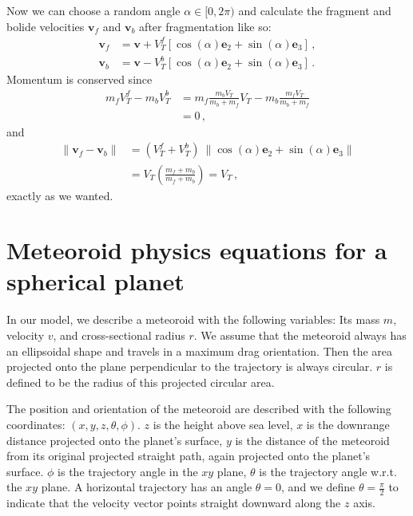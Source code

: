 Now we can choose a random angle $\alpha \in [0, 2\pi)$ and calculate the fragment and bolide velocities $\pmb{v}_f$ and $\pmb{v}_b$ after fragmentation like so:
\begin{align}
    \pmb{v}_f &= \pmb{v} + V_T^f[\cos(\alpha)\pmb{e}_2 + \sin(\alpha)\pmb{e}_3]\,,\\
    \pmb{v}_b &= \pmb{v} - V_T^b[\cos(\alpha)\pmb{e}_2 + \sin(\alpha)\pmb{e}_3]\,.
\end{align}
Momentum is conserved since
\begin{align*}
    m_f V_T^f - m_b V_T^b &= m_f\frac{m_b V_T}{m_b + m_f}V_T - m_b\frac{m_f V_T}{m_b + m_f} \\
    &= 0\,,
\end{align*}
and 
\begin{align*}
    \|\pmb{v}_f - \pmb{v}_b\| &= (V_T^f + V_T^b)\ \|\cos(\alpha)\pmb{e}_2 + \sin(\alpha)\pmb{e}_3\| \\
    &= V_T \left(\frac{m_f + m_b}{m_f + m_b}\right) = V_T\,,
\end{align*}
exactly as we wanted.

\section{Meteoroid physics equations for a spherical planet}
\label{sec:meteoroid_eq_deriv}
In our model, we describe a meteoroid with the following variables: Its mass $m$, velocity $v$, and cross-sectional radius $r$. We assume that the meteoroid always has an ellipsoidal shape and travels in a maximum drag orientation. Then the area projected onto the plane perpendicular to the trajectory is always circular. $r$ is defined to be the radius of this projected circular area.

The position and orientation of the meteoroid are described with the following coordinates: $(x, y, z, \theta, \phi)$. $z$ is the height above sea level, $x$ is the downrange distance projected onto the planet's surface, $y$ is the distance of the meteoroid from its original projected straight path, again projected onto the planet's surface. $\phi$ is the trajectory angle in the $xy$ plane, $\theta$ is the trajectory angle w.r.t. the $xy$ plane. A horizontal trajectory has an angle $\theta = 0$, and we define $\theta = \frac{\pi}{2}$ to indicate that the velocity vector points straight downward along the $z$ axis.

